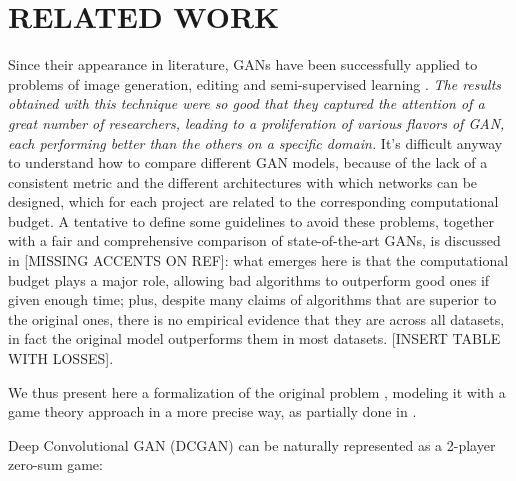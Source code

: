 \section{RELATED WORK} \label{relatedwork}

Since their appearance in literature, GANs have been successfully applied to problems of image generation, editing and semi-supervised learning \cite{DBLP:journals/corr/RadfordMC15} \cite{DBLP:journals/corr/ZhangXLZHWM16}. \textit{The results obtained with this technique were so good that they captured the attention of a great number of researchers, leading to a proliferation of various flavors of GAN, each performing better than the others on a specific domain.} It's difficult anyway to understand how to compare different GAN models, because of the lack of a consistent metric and the different architectures with which networks can be designed, which for each project are related to the corresponding computational budget. A tentative to define some guidelines to avoid these problems, together with a fair and comprehensive comparison of state-of-the-art GANs, is discussed in \cite{46506}[MISSING ACCENTS ON REF]: what emerges here is that the computational budget plays a major role, allowing bad algorithms to outperform good ones if given enough time; plus, despite many claims of algorithms that are superior to the original ones, there is no empirical evidence that they are across all datasets, in fact the original model outperforms them in most datasets. [INSERT TABLE WITH LOSSES].

We thus present here a formalization of the original problem \cite{NIPS2014_5423}, modeling it with a game theory approach in a more precise way, as partially done in \cite{2017arXiv171200679O}.

Deep Convolutional GAN (DCGAN) can be naturally represented as a 2-player zero-sum game: